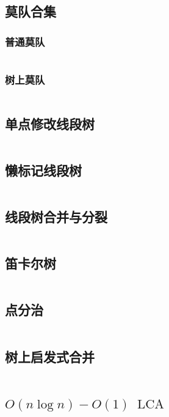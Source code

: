 \documentclass[titlepage, a4paper, 11pt]{article}
\begin{document}
\begin{spacing}{1.15}
				\subsection{莫队合集}
					\subsubsection{普通莫队}
						\inputminted{cpp}{src/DataStructure/莫队.cpp}
					\subsubsection{树上莫队}
						\inputminted{cpp}{src/DataStructure/树上莫队.cpp}
				\subsection{单点修改线段树}
					\inputminted{cpp}{src/DataStructure/单点修改线段树.cpp}
				\subsection{懒标记线段树}
					\inputminted{cpp}{src/DataStructure/懒标记线段树.cpp}
				\subsection{线段树合并与分裂}
					\inputminted{cpp}{src/DataStructure/线段树合并与分裂.cpp}
				\subsection{笛卡尔树}
					\inputminted{cpp}{src/DataStructure/笛卡尔树.cpp}
				\subsection{点分治}
					\inputminted{cpp}{src/DataStructure/点分治.cpp}
				\subsection{树上启发式合并}
					\inputminted{cpp}{src/DataStructure/dsu_on_tree.cpp}
				\subsection{$O(n \log n) - O(1)\ \text{ LCA}$}
					\inputminted{cpp}{src/DataStructure/o1lca.cpp}

\end{spacing}
\end{document}
